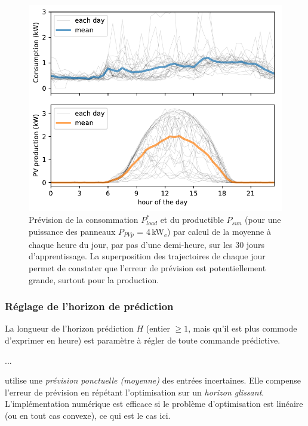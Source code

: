 \documentclass[a4paper,10pt,twocolumn]{article}
\newcommand\sub[1]{\textsubscript{#1}}
\begin{document}
\begin{figure}[!ht]
        \begin{center}
                \includegraphics[width=1\columnwidth]{figures/daily_traj_M-1-2011-11-28_PV4kWp.pdf}
        \end{center}

        \caption{Prévision de la consommation $P_{load}^*$ et du productible $P_{sun}$
        (pour une puissance des panneaux $P_{PVp}$ = 4\,kW\sub{c})
        par calcul de la moyenne à chaque heure du jour, par pas d'une demi-heure,
        sur les 30 jours d'apprentissage.
        La superposition des trajectoires de chaque jour permet de constater
        que l'erreur de prévision est potentiellement grande, surtout pour la production.
        }
        \label{fig:pred}
\end{figure}

\subsubsection{Réglage de l'horizon de prédiction}
La longueur de l'horizon prédiction $H$ (entier $\geq 1$, mais qu'il est plus commode d'exprimer en heure)
est paramètre à régler de toute commande prédictive.

...

utilise une \emph{prévision ponctuelle (moyenne)} des entrées incertaines.
Elle compense l'erreur de prévision en répétant l'optimisation sur un \emph{horizon glissant}.
L'implémentation numérique est efficace si le problème d'optimisation est linéaire (ou en tout cas convexe),
ce qui est le cas ici.
\end{document}
